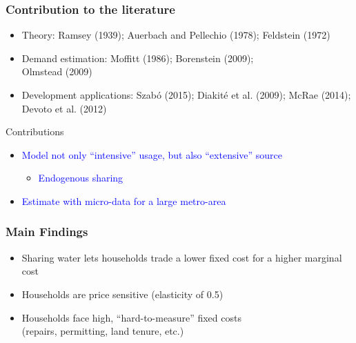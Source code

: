 \documentclass[aspectratio=149]{beamer}
\begin{document}
\begin{frame}
\frametitle{ Contribution to the literature}

\begin{itemize}
  \item \textcolor{navyblue}{Theory:} Ramsey (1939); Auerbach and Pellechio (1978); Feldstein (1972)
  \item \textcolor{navyblue}{Demand estimation:} Moffitt (1986); Borenstein (2009); \\ Olmstead (2009)
  \item \textcolor{navyblue}{Development applications:} Szab\'{o} (2015); Diakit\'{e} et al. (2009); McRae (2014); Devoto et al. (2012)
\end{itemize}
\vspace{.1cm}
Contributions
\vspace{.1cm}
\begin{itemize}
  \item \textcolor{blue}{Model not only ``intensive'' usage, but also ``extensive'' source} 
  \begin{itemize}
    \item \textcolor{blue}{Endogenous sharing}
  \end{itemize}
  \item \textcolor{blue}{Estimate with micro-data for a large metro-area}
  \end{itemize}
\end{frame}

\begin{frame}
\frametitle{Main Findings}

\begin{itemize}
  \item Sharing water lets households trade a lower fixed cost for a higher marginal cost
  \item Households are price sensitive (elasticity of 0.5)
  \item Households face high, ``hard-to-measure'' fixed costs \\
   (repairs, permitting, land tenure, etc.)
\end{itemize}
\vspace{.2cm}
\end{frame}
\end{document}
